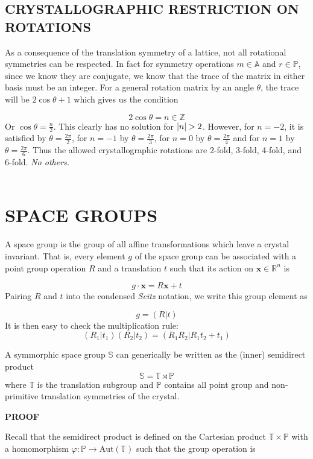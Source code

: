 \documentclass[9 pt]{report}
\def\*#1{\boldsymbol{#1}}
\begin{document}
{\centering
\subsection*{CRYSTALLOGRAPHIC RESTRICTION ON ROTATIONS}}
As a consequence of the translation symmetry of a lattice, not all rotational symmetries can be respected. In fact for symmetry operations $m\in \mathbb{A}$ and $r\in \mathbb{P}$, since we know they are conjugate, we know that the trace of the matrix in either basis must be an integer. For a general rotation matrix by an angle $\theta$, the trace will be $2\cos\theta + 1$ which gives us the condition

$$ 2\cos\theta = n \in \mathbb{Z} $$
Or $\cos\theta = \frac{n}{2}$. This clearly has no solution for $\abs{n}>2$. However, for $n=-2$, it is satisfied by $\theta=\frac{2\pi}{2}$, for $n=-1$ by $\theta=\frac{2\pi}{3}$, for $n=0$ by $\theta=\frac{2\pi}{4}$ and for $n=1$ by $\theta=\frac{2\pi}{6}$. Thus the allowed crystallographic rotations are 2-fold, 3-fold, 4-fold, and 6-fold. \emph{No others.}
\\
\\
\newpage

{\centering
\section*{SPACE GROUPS}}
A space group is the group of all affine transformations which leave a crystal invariant. That is, every element $g$ of the space group can be associated with a point group operation $R$ and a translation $t$ such that its action on $\*x\in\mathbb{R}^n$ is

$$ g\cdot\*x = R\*x + t $$
Pairing $R$ and $t$ into the condensed \emph{Seitz} notation, we write this group element as 

$$ g = (R | t) $$
It is then easy to check the multiplication rule: 
$$ (R_1|t_1)(R_2|t_2) = (R_1R_2 | R_1t_2 + t_1) $$

\begin{tcolorbox}
A symmorphic space group $\mathbb{S}$ can generically be written as the (inner) semidirect product 
$$\mathbb{S} = \mathbb{T}\rtimes\mathbb{P}$$
where $\mathbb{T}$ is the translation subgroup and $\mathbb{P}$ contains all point group and non-primitive translation symmetries of the crystal. 
\end{tcolorbox}

\begin{center}
	\textbf{PROOF}
\end{center}
Recall that the semidirect product is defined on the Cartesian product $\mathbb{T}\times\mathbb{P}$ with a homomorphism $\varphi:\mathbb{P}\to \text{Aut}(\mathbb{T})$ such that the group operation is
\end{document}
